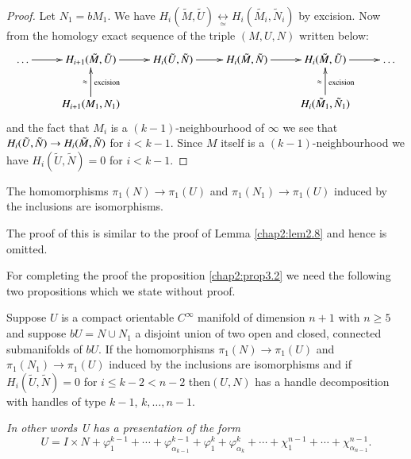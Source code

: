 \begin{proof}
Let $N_1 = bM_1$. We have $H_i (\tilde{M}, \tilde{U})
\underset{\simeq}{ \longleftrightarrow}H _i (\tilde {M_i},
\tilde{N}_i)$ by excision. Now from the homology exact sequence of the
triple $(M, U, N)$ written below: 
{\fontsize{8}{10}\selectfont
\[
\xymatrix{
\ldots \ar[r] & H_{i+1} (\tilde{M}, \tilde{U}) \ar[r] & H_i(\tilde{U},
\tilde{N}) \ar[r] & H_i (\tilde{M}, \tilde{N}) \ar[r] & H_i
(\tilde{M}, \tilde{U}) \ar[r] & \ldots\\
& H_{i+1} (M_1, N_1) \ar[u]^{\approx}_{\rm excision} & & &
H_i(\tilde{M}_1, \tilde{N}_1) \ar[u]^{\approx}_{\rm excision}
}
\]}\relax 
 and the fact that $M_i$ is a $(k-1)$-neighbourhood of $\infty$ we see
 that $H_i (\tilde{U},\break \tilde{N}) \to H_i(\tilde{M}, \tilde{N})$ for $
 i < k-1$. Since $M$ itself is a $(k-1)$-neighbourhood we have
 $H_i(\tilde {U}, \tilde{N}) = 0$ for $i < k-1$. 
\end{proof}

\begin{alphremark}\label{chap2:alphremB}%
 The homomorphisms $\pi_1 (N) \to \pi _1 (U)$ and $\pi_1
(N_1) \to \pi_1 (U)$ induced by the inclusions are isomorphisms. 
 \end{alphremark} 
 
 The proof of this is similar to the proof of Lemma \ref{chap2:lem2.8}
 and hence is omitted. 
 
 For completing the proof the proposition \ref{chap2:prop3.2} we need the following
 two propositions which we state without proof. 

\setcounter{prop}{6}
 \begin{prop}\label{chap2:prop3.7}%
Suppose $U$ is a compact orientable $C^\infty$ manifold of dimension
$n+1$ with $n\geq 5$ and suppose $bU = N \cup N_1$ a disjoint union of
two open and closed, connected submanifolds of $bU$. If the
homomorphisms $\pi_1(N) \to \pi_1(U)$ and $\pi_1 (N_1) \to \pi_1(U)$
induced by the inclusions are isomorphisms and if $H_i (\tilde{U},
\tilde{N}) = 0$ for $i \leq k - 2 < n-2$ then\pageoriginale $(U, N)$
has a handle decomposition with handles of type $k-1$, $k,\ldots,
n-1$.  
 \end{prop} 
 
 \textit{In other words U has a presentation of the form}
 $$
 U = I \times N + \varphi _{1}^{k-1} + \cdots +
 \varphi^{k-1}_{\alpha_{k-1}} + \varphi^{k}_1+
 \varphi^{k}_{\alpha_{k}}+ \cdots +  \chi^{n-1}_1 + \cdots +
 \chi^{n-1}_{\alpha _{n-1}}. 
 $$
 
